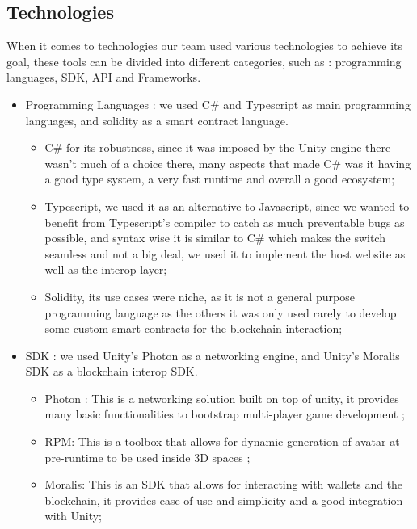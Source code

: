   \subsection{Technologies}
  When it comes to technologies our team used various technologies to achieve its goal, these tools can be divided into different categories, such as : programming languages, \ac{SDK}, \ac{API} and Frameworks.
  \begin{itemize}
    \item Programming Languages : we used C\# and Typescript as main programming languages, and solidity as a smart contract language.
          \begin{itemize}
            \item C\# for its robustness, since it was imposed by the Unity engine there wasn't much of a choice there, many aspects that made C\# was it having a good type system, a very fast runtime and overall a good ecosystem;
            \item Typescript, we used it as an alternative to Javascript, since we wanted to benefit from Typescript's compiler to catch as much preventable bugs as possible, and syntax wise it is similar to C\# which makes the switch seamless and not a big deal, we used it to implement the host website as well as the interop layer;
            \item Solidity, its use cases were niche, as it is not a general purpose programming language as the others it was only used rarely to develop some custom smart contracts for the blockchain interaction;
          \end{itemize}        
    \item \ac{SDK} : we used Unity's Photon as a networking engine, and Unity's Moralis SDK as a blockchain interop SDK.
          \begin{itemize}
            \item Photon : This is a networking solution built on top of unity, it provides many basic functionalities to bootstrap multi-player game development \cite[p.~9]{4};
            \item \ac{RPM}: This is a toolbox that allows for dynamic generation of avatar at pre-runtime to be used inside 3D spaces \cite[p.~9]{5};
            \item Moralis: This is an SDK that allows for interacting with wallets and the blockchain, it provides ease of use and simplicity and a good integration with Unity\cite[p.~9]{7};
          \end{itemize}    

\end{itemize}
